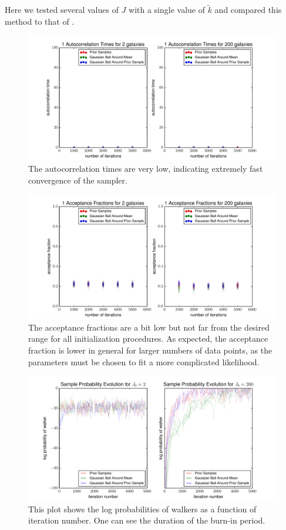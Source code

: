\documentclass[preprint]{aastex}
\begin{document}
Here we tested several values of $J$ with a single value of $\tilde{k}$ and compared this method to that of \citet{she11}.

\begin{figure}
\includegraphics[width=\textwidth]{acorr.pdf}
\caption{The autocorrelation times are very low, indicating extremely fast convergence of the sampler.}
\label{fig:dumbestacor}
\end{figure}

\begin{figure}
\includegraphics[width=\textwidth]{fracs.pdf}
\caption{The acceptance fractions are a bit low but not far from the desired range for all initialization procedures.  As expected, the acceptance fraction is lower in general for larger numbers of data points, as the parameters must be chosen to fit a more complicated likelihood.}
\label{fig:dumbestfrac}
\end{figure}

\begin{figure}
\includegraphics[width=\textwidth]{lnprobs.pdf}
\caption{This plot shows the log probabilities of walkers as a function of iteration number.  One can see the duration of the burn-in period.}
\label{fig:dumbestprob}
\end{figure}
\end{document}
